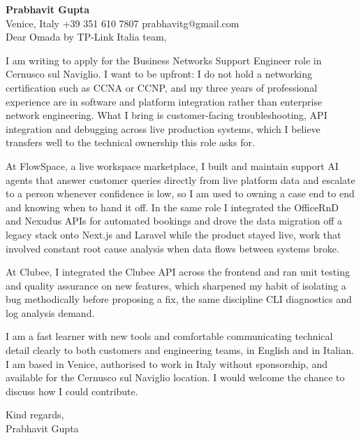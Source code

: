 \documentclass[a4paper,10.5pt]{article}
\begin{document}
\textbf{Prabhavit Gupta}\\
Venice, Italy \textbar{} +39 351 610 7807 \textbar{} prabhavitg@gmail.com\\[10pt]
Dear Omada by TP-Link Italia team,

I am writing to apply for the Business Networks Support Engineer role in Cernusco sul Naviglio. I want to be upfront: I do not hold a networking certification such as CCNA or CCNP, and my three years of professional experience are in software and platform integration rather than enterprise network engineering. What I bring is customer-facing troubleshooting, API integration and debugging across live production systems, which I believe transfers well to the technical ownership this role asks for.

At FlowSpace, a live workspace marketplace, I built and maintain support AI agents that answer customer queries directly from live platform data and escalate to a person whenever confidence is low, so I am used to owning a case end to end and knowing when to hand it off. In the same role I integrated the OfficeRnD and Nexudus APIs for automated bookings and drove the data migration off a legacy stack onto Next.js and Laravel while the product stayed live, work that involved constant root cause analysis when data flows between systems broke.

At Clubee, I integrated the Clubee API across the frontend and ran unit testing and quality assurance on new features, which sharpened my habit of isolating a bug methodically before proposing a fix, the same discipline CLI diagnostics and log analysis demand.

I am a fast learner with new tools and comfortable communicating technical detail clearly to both customers and engineering teams, in English and in Italian. I am based in Venice, authorised to work in Italy without sponsorship, and available for the Cernusco sul Naviglio location. I would welcome the chance to discuss how I could contribute.

Kind regards,\\
Prabhavit Gupta
\end{document}
